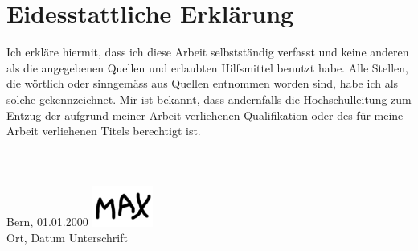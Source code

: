 \section*{Eidesstattliche Erklärung}
Ich erkläre hiermit, dass ich diese Arbeit selbstständig verfasst und keine anderen als die angegebenen Quellen und erlaubten Hilfsmittel benutzt habe. Alle Stellen, die wörtlich oder sinngemäss aus Quellen entnommen worden sind, habe ich als solche gekennzeichnet. Mir ist bekannt, dass andernfalls die Hochschulleitung zum Entzug der aufgrund meiner Arbeit verliehenen Qualifikation oder des für meine Arbeit verliehenen Titels berechtigt ist.\\
\\
\\
\\
Bern, 01.01.2000 \hfill \includegraphics[width=2cm]{content/00_assets/unterschrift.png}\\
Ort, Datum \hfill Unterschrift
